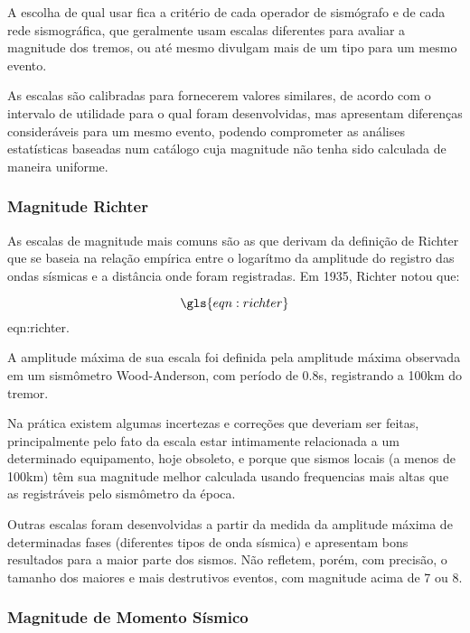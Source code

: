 A escolha de qual usar fica a critério
de cada operador de sismógrafo e de cada rede sismográfica, que geralmente usam escalas diferentes
para avaliar a magnitude dos tremos, ou até mesmo divulgam mais de um tipo para
um mesmo evento.

As escalas são calibradas para fornecerem valores similares, de acordo com
o intervalo de utilidade para o qual foram desenvolvidas, mas apresentam diferenças consideráveis para um mesmo evento, 
podendo comprometer as análises estatísticas baseadas num catálogo cuja magnitude não tenha sido calculada de maneira uniforme.


\subsubsection{Magnitude Richter}
\label{sec:magnitude_richter}

As escalas de magnitude mais comuns são as que derivam da definição de Richter \citep{richter_1935}
que se baseia na relação empírica entre o logarítmo da amplitude do registro das ondas sísmicas e a distância onde foram
registradas. Em 1935, Richter notou que:

\begin{equation}
	\gls{eqn:richter}
	\label{eq:richter}
\end{equation}
\glsdesc*{eqn:richter}.


A amplitude máxima de sua
escala foi definida pela amplitude máxima observada em um sismômetro Wood-Anderson, com período de 0.8s, registrando a 100km 
do tremor.

Na prática existem algumas incertezas e correções que deveriam ser feitas, principalmente pelo fato da escala estar intimamente 
relacionada a um determinado equipamento, hoje obsoleto, e porque que sismos locais (a menos de 100km) têm sua magnitude
melhor calculada usando frequencias mais altas que as registráveis pelo sismômetro da época.


Outras escalas foram desenvolvidas a partir da medida da amplitude máxima de determinadas fases 
(diferentes tipos de onda sísmica) e apresentam bons resultados para a maior parte dos sismos.
Não refletem, porém, com precisão, o tamanho dos maiores e mais destrutivos eventos, com magnitude acima de 7 ou 8.


\subsubsection{Magnitude de Momento Sísmico }
\label{sec:risco_sismico}

